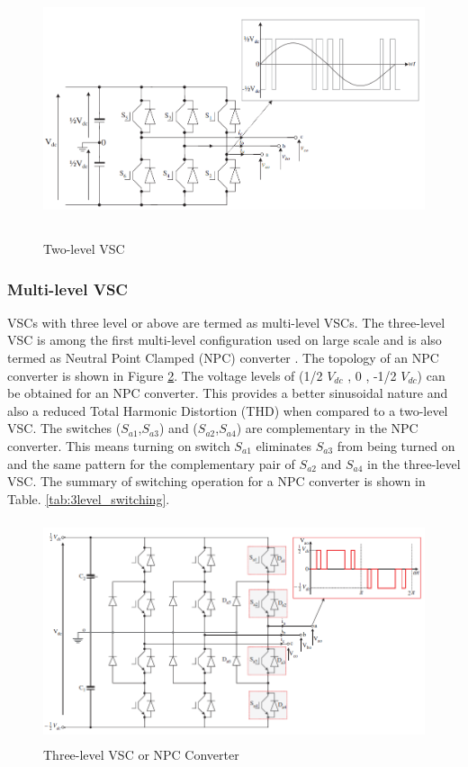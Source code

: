 \begin{figure}[H]
\centering
    \includegraphics[height = 7.5cm,width = 15.5cm]{Diagrams/Chapter_2/2levelVSC.PNG}
    \caption{Two-level VSC \cite{noauthor_appendix_2014-1}}
    \label{fig:2levelVSC}
\end{figure}

\subsubsection{Multi-level VSC}
\gls{VSC}s with three level or above are termed as multi-level \gls{VSC}s. The three-level \gls{VSC} is among the first multi-level configuration used on large scale and is also termed as Neutral Point Clamped (\gls{NPC}) converter \cite{sharifabadi2016design}. The topology of an \gls{NPC} converter is shown in Figure \ref{fig:3levelVSC}. The voltage levels of (1/2 $V_{dc}$ , 0 , -1/2 $V_{dc}$) can be obtained for an \gls{NPC} converter. This provides a better sinusoidal nature and also a reduced Total Harmonic Distortion (\gls{THD}) when compared to a two-level \gls{VSC}. The switches ($S_{a1}$,$S_{a3}$) and ($S_{a2}$,$S_{a4}$) are complementary in the \gls{NPC} converter. This means turning on switch $S_{a1}$ eliminates $S_{a3}$ from being turned on and the same pattern for the complementary pair of $S_{a2}$ and $S_{a4}$ in the three-level \gls{VSC}. The summary of switching operation for a \gls{NPC} converter is shown in Table. \ref{tab:3level_switching}. 

\begin{figure}[H]
\centering
    \includegraphics[height = 6.5cm,width = 14.5cm]{Diagrams/Chapter_2/3levelVSC.PNG}
    \caption{Three-level VSC or NPC Converter \cite{noauthor_appendix_2014-1}}
    \label{fig:3levelVSC}
\end{figure}

